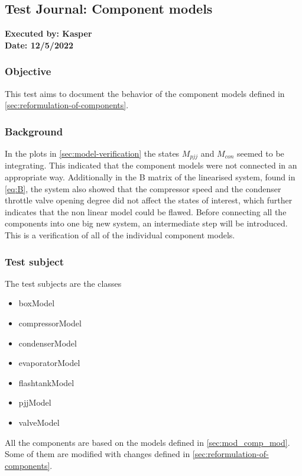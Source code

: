 \subsection{Test Journal: Component models} \label{app:tj_0}

\textbf{Executed by: Kasper} \\
\textbf{Date: 12/5/2022}

\subsubsection*{Objective}
This test aims to document the behavior of the component models defined in \cref{sec:reformulation-of-components}.

\subsubsection*{Background}
In the plots in \cref{sec:model-verification} the states $ M_{pjj} $ and $ M_{con} $ seemed to be integrating. This indicated that the component models were not connected in an appropriate way.
Additionally in the B matrix of the linearised system, found in \cref{eq:B}, the system also showed that the compressor speed and the condenser throttle valve opening degree did not affect the states of interest, which further indicates that the non linear model could be flawed.
Before connecting all the components into one big new system, an intermediate step will be introduced. This is a verification of all of the individual component models.


\subsubsection*{Test subject}
The test subjects are the classes
\begin{itemize}
	\item boxModel
	\item compressorModel
	\item condenserModel
	\item evaporatorModel
	\item flashtankModel
	\item pjjModel
	\item valveModel
\end{itemize}
All the components are based on the models defined in \cref{sec:mod_comp_mod}. Some of them are modified with changes defined in \cref{sec:reformulation-of-components}.\\

